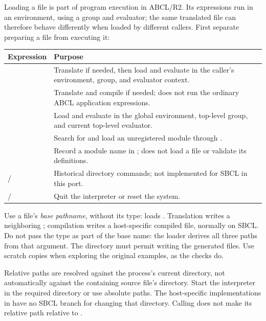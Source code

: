 \label{sec:loading}

Loading a file is part of program execution in ABCL/R2. Its expressions
run in an environment, using a group and evaluator; the same translated
file can therefore behave differently when loaded by different callers.
First separate preparing a file from executing it:

\par\medskip\noindent
\begin{minipage}{\linewidth}
\begin{tabular}{L{0.32\textwidth}L{0.58\textwidth}}
\textbf{Expression} & \textbf{Purpose}\\\hline
{} & Translate if needed, then load and evaluate in the
caller's environment, group, and evaluator context.\\
 & Translate and compile if needed; does not run the
ordinary ABCL application expressions.\\
 & Load and evaluate in the global environment,
top-level group, and current top-level evaluator.\\
 & Search for and load an unregistered module through
.\\
 & Record a module name in ; does not
load a file or validate its definitions.\\
 /  & Historical directory commands;
not implemented for SBCL in this port.\\
 /  & Quit the interpreter or reset the system.\\
\end{tabular}
\end{minipage}\par\medskip

Use a file's \emph{base pathname}, without its type:
 loads .
Translation writes a neighboring ; compilation writes
a host-specific compiled file, normally  on SBCL.
Do not pass the  type as part of the base name: the loader
derives all three paths from that argument.
The directory must permit writing the generated files. Use scratch
copies when exploring the original examples, as the checks do.

Relative paths are resolved against the process's current directory,
not automatically against the containing source file's directory.
Start the interpreter in the required directory or use absolute paths.
The host-specific implementations in  have
no SBCL branch for changing that directory. Calling  does
not make its relative path relative to .

